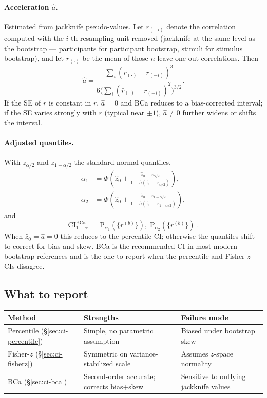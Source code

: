 \documentclass[11pt]{article}
\begin{document}
\paragraph{Acceleration $\hat a$.} Estimated from jackknife pseudo-values. Let $r_{(-i)}$ denote the correlation computed with the $i$-th resampling unit removed (jackknife at the same level as the bootstrap --- participants for participant bootstrap, stimuli for stimulus bootstrap), and let $\bar r_{(\cdot)}$ be the mean of those $n$ leave-one-out correlations. Then
\begin{equation}
\hat a = \frac{\sum_i (\bar r_{(\cdot)} - r_{(-i)})^3}{6\bigl(\sum_i (\bar r_{(\cdot)} - r_{(-i)})^2\bigr)^{3/2}}.
\label{eq:bca-a}
\end{equation}
If the SE of $r$ is constant in $r$, $\hat a = 0$ and BCa reduces to a bias-corrected interval; if the SE varies strongly with $r$ (typical near $\pm 1$), $\hat a \neq 0$ further widens or shifts the interval.

\paragraph{Adjusted quantiles.} With $z_{\alpha/2}$ and $z_{1-\alpha/2}$ the standard-normal quantiles,
\begin{align}
\alpha_1 &= \Phi\!\left(\hat z_0 + \frac{\hat z_0 + z_{\alpha/2}}{1 - \hat a(\hat z_0 + z_{\alpha/2})}\right), \\
\alpha_2 &= \Phi\!\left(\hat z_0 + \frac{\hat z_0 + z_{1-\alpha/2}}{1 - \hat a(\hat z_0 + z_{1-\alpha/2})}\right),
\end{align}
and
\begin{equation}
\mathrm{CI}^{\mathrm{BCa}}_{1-\alpha} = \bigl[\mathrm{P}_{\alpha_1}(\{r^{(b)}\}),\; \mathrm{P}_{\alpha_2}(\{r^{(b)}\})\bigr].
\label{eq:ci-bca}
\end{equation}
When $\hat z_0 = \hat a = 0$ this reduces to the percentile CI; otherwise the quantiles shift to correct for bias and skew. BCa is the recommended CI in most modern bootstrap references and is the one to report when the percentile and Fisher-$z$ CIs disagree.

\subsection{What to report}
\label{sec:ci-report}
\begin{center}
\begin{tabular}{lll}
\toprule
Method & Strengths & Failure mode \\
\midrule
Percentile (\S\ref{sec:ci-percentile}) & Simple, no parametric assumption        & Biased under bootstrap skew \\
Fisher-$z$ (\S\ref{sec:ci-fisherz})    & Symmetric on variance-stabilized scale  & Assumes $z$-space normality \\
BCa (\S\ref{sec:ci-bca})               & Second-order accurate; corrects bias+skew & Sensitive to outlying jackknife values \\
\bottomrule
\end{tabular}
\end{center}
\end{document}
